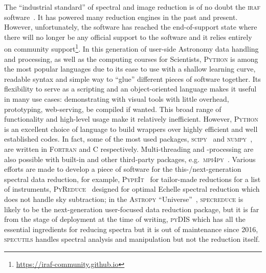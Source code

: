 \documentclass[fleqn,usenatbib]{mnras}
\begin{document}
The ``industrial standard'' of spectral and image reduction is of no doubt the
\textsc{iraf} software~\citep{1986SPIE..627..733T, 1993ASPC...52..173T}. It has powered many
reduction engines in the past and present. However, unfortunately, the software has reached
the end-of-support state where there will no longer be any official support to the software
and it relies entirely on community support\footnote{\url{https://iraf-community.github.io}}.
In this generation of user-side Astronomy data handling and processing, as well as the
computing courses for Scientists, \textsc{Python} is among the most popular languages due to
its ease to use with a shallow learning curve, readable syntax and simple way to ``glue''
different pieces of software together. Its flexibility to serve as a scripting and an
object-oriented language makes it useful in many use cases: demonstrating with visual tools
with little overhead, prototyping, web-serving, be compiled if wanted. This broad range of
functionality and high-level usage make it relatively inefficient. However, \textsc{Python}
is an excellent choice of language to build wrappers over highly efficient and well
established codes. In fact, some of the most used packages,
\textsc{scipy}~\citep{2020SciPy-NMeth} and \textsc{numpy}~\citep{2020NumPy-Array},
are written in \textsc{Fortran} and \textsc{C} respectively. Multi-threading and -processing
are also possible with built-in and other third-party packages, e.g.\ \textsc{mpi4py}~\citep{DALCIN20111124}. 
Various efforts are made to develop a piece of software for the this-/next-generation 
spectral data reduction, for example, \textsc{PypeIt}~\citep{pypeit:zenodo, pypeit:joss_pub}
for tailor-made reductions for a list of instruments, \textsc{PyReduce}~\citep{2021A&A...646A..32P}
designed for optimal Echelle spectral reduction which does not handle sky subtraction;
in the \textsc{Astropy} ``Universe''~\citep{astropy:2013, astropy:2018}, \textsc{specreduce}
is likely to be the next-generation user-focused data reduction package, but it is far from
the stage of deployment at the time of writing, \textsc{pyDIS} which has all the essential
ingredients for reducing spectra but it is out of maintenance since 2016, \textsc{specutils}
handles spectral analysis and manipulation but not the reduction itself.
\end{document}
